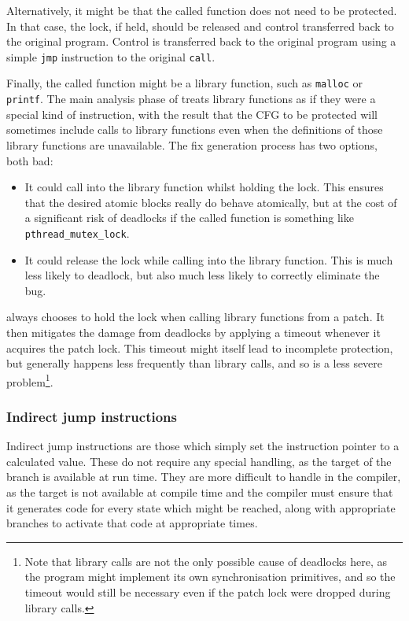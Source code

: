 Alternatively, it might be that the called function does not need to
be protected.  In that case, the lock, if held, should be released and
control transferred back to the original program.  Control is
transferred back to the original program using a simple \texttt{jmp}
instruction to the original \texttt{call}.

Finally, the called function might be a library function, such as
\texttt{malloc} or \texttt{printf}.  The main analysis
phase of {\technique} treats library functions as if they were a
special kind of instruction, with the result that the CFG to be
protected will sometimes include calls to library functions even when
the definitions of those library functions are unavailable.  The fix
generation process has two options, both bad:

\begin{itemize}
\item It could call into the library function whilst holding the lock.
  This ensures that the desired atomic blocks really do behave
  atomically, but at the cost of a significant risk of deadlocks if
  the called function is something like \texttt{pthread\_mutex\_lock}.
\item It could release the lock while calling into the library
  function.  This is much less likely to deadlock, but also much
  less likely to correctly eliminate the bug.
\end{itemize}

{\Implementation} always chooses to hold the lock when calling library
functions from a patch.  It then mitigates the damage from deadlocks
by applying a timeout whenever it acquires the patch lock.  This
timeout might itself lead to incomplete protection, but generally
happens less frequently than library calls, and so is a less severe
problem\footnote{Note that library calls are not the only possible
  cause of deadlocks here, as the program might implement its own
  synchronisation primitives\needCite{}, and so the timeout would
  still be necessary even if the patch lock were dropped during
  library calls.}.

\subsubsection{Indirect jump instructions}

Indirect jump instructions are those which simply set the instruction
pointer to a calculated value.  These do not require any special
handling, as the target of the branch is available at run time.  They
are more difficult to handle in the compiler, as the target is not
available at compile time and the compiler must ensure that it
generates code for every state which might be reached, along with
appropriate branches to activate that code at appropriate times.

